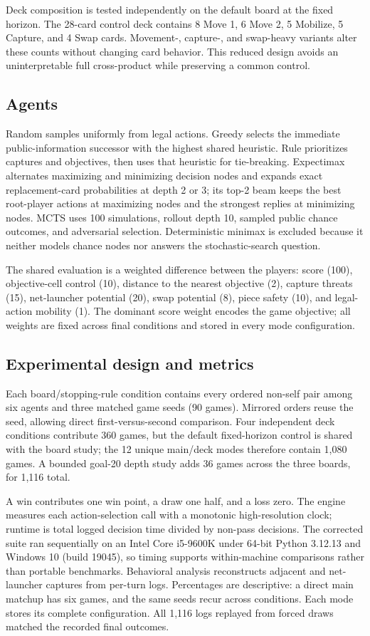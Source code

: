 \documentclass[letterpaper]{article} %
\begin{document}
Deck composition is tested independently on the default board at the fixed horizon. The 28-card control deck contains 8 Move 1, 6 Move 2, 5 Mobilize, 5 Capture, and 4 Swap cards. Movement-, capture-, and swap-heavy variants alter these counts without changing card behavior. This reduced design avoids an uninterpretable full cross-product while preserving a common control.

\subsection{Agents}

Random samples uniformly from legal actions. Greedy selects the immediate public-information successor with the highest shared heuristic. Rule prioritizes captures and objectives, then uses that heuristic for tie-breaking. Expectimax alternates maximizing and minimizing decision nodes and expands exact replacement-card probabilities at depth 2 or 3; its top-2 beam keeps the best root-player actions at maximizing nodes and the strongest replies at minimizing nodes. MCTS uses 100 simulations, rollout depth 10, sampled public chance outcomes, and adversarial selection. Deterministic minimax is excluded because it neither models chance nodes nor answers the stochastic-search question.

The shared evaluation is a weighted difference between the players: score (100), objective-cell control (10), distance to the nearest objective (2), capture threats (15), net-launcher potential (20), swap potential (8), piece safety (10), and legal-action mobility (1). The dominant score weight encodes the game objective; all weights are fixed across final conditions and stored in every mode configuration.

\subsection{Experimental design and metrics}

Each board/stopping-rule condition contains every ordered non-self pair among six agents and three matched game seeds (90 games). Mirrored orders reuse the seed, allowing direct first-versus-second comparison. Four independent deck conditions contribute 360 games, but the default fixed-horizon control is shared with the board study; the 12 unique main/deck modes therefore contain 1,080 games. A bounded goal-20 depth study adds 36 games across the three boards, for 1,116 total.

A win contributes one win point, a draw one half, and a loss zero. The engine measures each action-selection call with a monotonic high-resolution clock; runtime is total logged decision time divided by non-pass decisions. The corrected suite ran sequentially on an Intel Core i5-9600K under 64-bit Python 3.12.13 and Windows 10 (build 19045), so timing supports within-machine comparisons rather than portable benchmarks. Behavioral analysis reconstructs adjacent and net-launcher captures from per-turn logs. Percentages are descriptive: a direct main matchup has six games, and the same seeds recur across conditions. Each mode stores its complete configuration. All 1,116 logs replayed from forced draws matched the recorded final outcomes.
\end{document}
